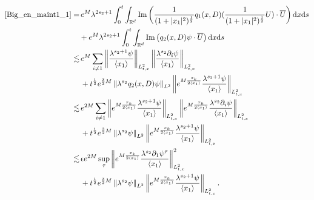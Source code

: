 \documentclass[10pt,twoside,a4paper]{article}
\numberwithin{equation}{section}\allowdisplaybreaks
\begin{document}
\begin{align*}
	\eqref{Big_en_maint1_1}= &\,e^{M}\lambda^{2s_2+1}  	\int_0^t \int_{\mathbb{R}^d}  \mathrm{Im}   \left( \frac{1}{( 1+ |x_1| ^2 )^{\frac 12}} q_1(x,D)  ( \frac{1}{( 1+ |x_1| ^2 )^{\frac 12}}   U)\cdot \overline{U}\right)  \mathrm{d} x \mathrm{d} s \\
	&+e^{M}\lambda^{2s_2+1}  	\int_0^t \int_{\mathbb{R}^d}  \mathrm{Im} \left(  q_2(x,D)   \psi \cdot  \overline{U}\right)  \mathrm{d} x \mathrm{d} s \\
	\lesssim & \,e^{M}  \sum_{ i\neq 1 }	 \left\|   \frac{ \lambda^{s_2+1}  \psi }{\langle x_1\rangle } \right\|_{L^2_{t,x}}  \left\|  \frac{ \lambda^{s_2}  \partial_i  \psi }{\langle x_1\rangle } \right\|_{L^2_{t,x}}\\
	&\,+ t^{\frac 12} e^{\frac 32M}  \left\|\lambda^{s_2} q_2(x,D)   \psi\right\|_{L^2} \left\| e^{M \frac{x_k}{2\langle x_1\rangle} }  \frac{ \lambda^{s_2+1}  \psi }{\langle x_1\rangle } \right\|_{L^2_{t,x}}  \\
	\lesssim &\, e^{2M}  \sum_{ i\neq 1 }	 \left\| e^{M \frac{x_k}{2\langle x_1\rangle} }  \frac{ \lambda^{s_2+1}  \psi }{\langle x_1\rangle } \right\|_{L^2_{t,x}}  \left\| e^{M \frac{x_k}{2\langle x_1\rangle} }  \frac{ \lambda^{s_2}  \partial_i  \psi }{\langle x_1\rangle } \right\|_{L^2_{t,x}} \\
	&\,+ t^{\frac 12} e^{\frac 32M}  \left\|\lambda^{s_2}   \psi\right\|_{L^2} \left\| e^{M \frac{x_k}{2\langle x_1\rangle} }  \frac{ \lambda^{s_2+1}  \psi }{\langle x_1\rangle } \right\|_{L^2_{t,x}}  \\
	\lesssim & \, \epsilon e^{2M}  \sup_{\tau}	  \left\| e^{M \frac{x_k}{2\langle x_1\rangle} }  \frac{ \lambda^{s_2}  \partial_1  \psi^{\tau} }{\langle x_1\rangle } \right\|_{L^2_{t,x}}^2 \\
	&\,+ t^{\frac 12} e^{\frac 32M}  \left\|\lambda^{s_2}   \psi\right\|_{L^2} \left\| e^{M \frac{x_k}{2\langle x_1\rangle} }  \frac{ \lambda^{s_2+1}  \psi }{\langle x_1\rangle } \right\|_{L^2_{t,x}}.
\end{align*}
\end{document}
